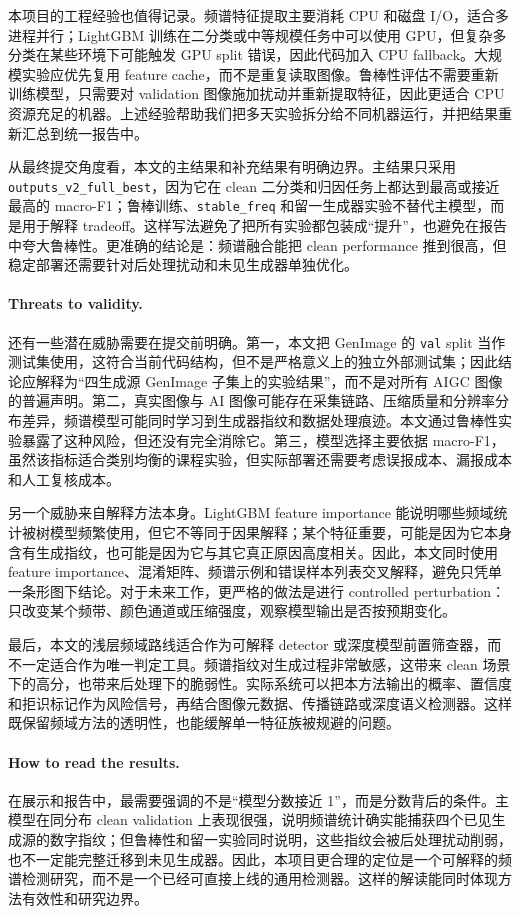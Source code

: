 \documentclass[sigconf,nonacm]{acmart}
\begin{document}
本项目的工程经验也值得记录。频谱特征提取主要消耗 CPU 和磁盘 I/O，适合多进程并行；LightGBM 训练在二分类或中等规模任务中可以使用 GPU，但复杂多分类在某些环境下可能触发 GPU split 错误，因此代码加入 CPU fallback。大规模实验应优先复用 feature cache，而不是重复读取图像。鲁棒性评估不需要重新训练模型，只需要对 validation 图像施加扰动并重新提取特征，因此更适合 CPU 资源充足的机器。上述经验帮助我们把多天实验拆分给不同机器运行，并把结果重新汇总到统一报告中。

从最终提交角度看，本文的主结果和补充结果有明确边界。主结果只采用 \texttt{outputs\_v2\_full\_best}，因为它在 clean 二分类和归因任务上都达到最高或接近最高的 macro-F1；鲁棒训练、\texttt{stable\_freq} 和留一生成器实验不替代主模型，而是用于解释 tradeoff。这样写法避免了把所有实验都包装成“提升”，也避免在报告中夸大鲁棒性。更准确的结论是：频谱融合能把 clean performance 推到很高，但稳定部署还需要针对后处理扰动和未见生成器单独优化。

\paragraph{Threats to validity.}
还有一些潜在威胁需要在提交前明确。第一，本文把 GenImage 的 \texttt{val} split 当作测试集使用，这符合当前代码结构，但不是严格意义上的独立外部测试集；因此结论应解释为“四生成源 GenImage 子集上的实验结果”，而不是对所有 AIGC 图像的普遍声明。第二，真实图像与 AI 图像可能存在采集链路、压缩质量和分辨率分布差异，频谱模型可能同时学习到生成器指纹和数据处理痕迹。本文通过鲁棒性实验暴露了这种风险，但还没有完全消除它。第三，模型选择主要依据 macro-F1，虽然该指标适合类别均衡的课程实验，但实际部署还需要考虑误报成本、漏报成本和人工复核成本。

另一个威胁来自解释方法本身。LightGBM feature importance 能说明哪些频域统计被树模型频繁使用，但它不等同于因果解释；某个特征重要，可能是因为它本身含有生成指纹，也可能是因为它与其它真正原因高度相关。因此，本文同时使用 feature importance、混淆矩阵、频谱示例和错误样本列表交叉解释，避免只凭单一条形图下结论。对于未来工作，更严格的做法是进行 controlled perturbation：只改变某个频带、颜色通道或压缩强度，观察模型输出是否按预期变化。

最后，本文的浅层频域路线适合作为可解释 detector 或深度模型前置筛查器，而不一定适合作为唯一判定工具。频谱指纹对生成过程非常敏感，这带来 clean 场景下的高分，也带来后处理下的脆弱性。实际系统可以把本方法输出的概率、置信度和拒识标记作为风险信号，再结合图像元数据、传播链路或深度语义检测器。这样既保留频域方法的透明性，也能缓解单一特征族被规避的问题。

\paragraph{How to read the results.}
在展示和报告中，最需要强调的不是“模型分数接近 1”，而是分数背后的条件。主模型在同分布 clean validation 上表现很强，说明频谱统计确实能捕获四个已见生成源的数字指纹；但鲁棒性和留一实验同时说明，这些指纹会被后处理扰动削弱，也不一定能完整迁移到未见生成器。因此，本项目更合理的定位是一个可解释的频谱检测研究，而不是一个已经可直接上线的通用检测器。这样的解读能同时体现方法有效性和研究边界。
\end{document}

